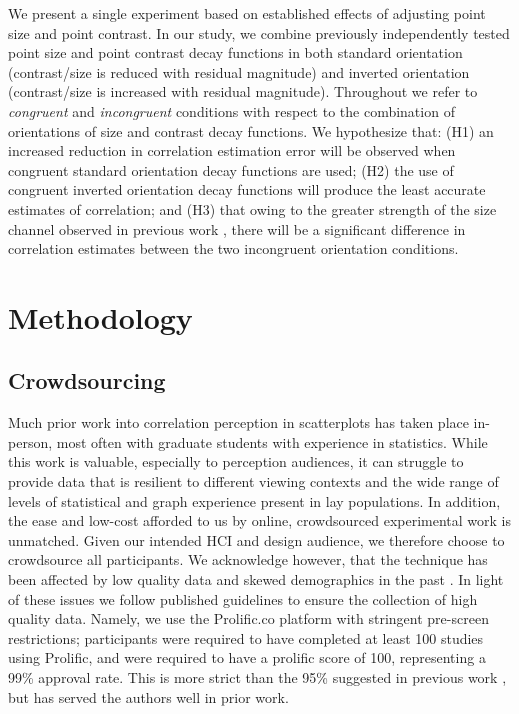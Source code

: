 \documentclass[manuscript, review, anonymous, screen]{acmart}
\begin{document}
We present a single experiment based on established effects of adjusting
point size and point contrast. In our study, we combine previously
independently tested point size and point contrast decay functions in
both standard orientation (contrast/size is reduced with residual
magnitude) and inverted orientation (contrast/size is increased with
residual magnitude). Throughout we refer to \emph{congruent} and
\emph{incongruent} conditions with respect to the combination of
orientations of size and contrast decay functions. We hypothesize that:
(H1) an increased reduction in correlation estimation error will be
observed when congruent standard orientation decay functions are used;
(H2) the use of congruent inverted orientation decay functions will
produce the least accurate estimates of correlation; and (H3) that owing
to the greater strength of the size channel observed in previous work
\citep{strain_2023b}, there will be a significant difference in
correlation estimates between the two incongruent orientation
conditions.

\hypertarget{sec-methods}{%
\section{Methodology}\label{sec-methods}}

\hypertarget{sec-crowdsourcing}{%
\subsection{Crowdsourcing}\label{sec-crowdsourcing}}

Much prior work into correlation perception in scatterplots has taken
place in-person, most often with graduate students with experience in
statistics. While this work is valuable, especially to perception
audiences, it can struggle to provide data that is resilient to
different viewing contexts and the wide range of levels of statistical
and graph experience present in lay populations. In addition, the ease
and low-cost afforded to us by online, crowdsourced experimental work is
unmatched. Given our intended HCI and design audience, we therefore
choose to crowdsource all participants. We acknowledge however, that the
technique has been affected by low quality data and skewed demographics
in the past \citep{chmielewski_2020, charalambides_2021, peer_2021}. In
light of these issues we follow published guidelines \citep{peer_2021}
to ensure the collection of high quality data. Namely, we use the
Prolific.co platform \citep{prolific} with stringent pre-screen
restrictions; participants were required to have completed at least 100
studies using Prolific, and were required to have a prolific score of
100, representing a 99\% approval rate. This is more strict than the
95\% suggested in previous work \citep{peer_2021}, but has served the
authors well in prior work.
\end{document}
